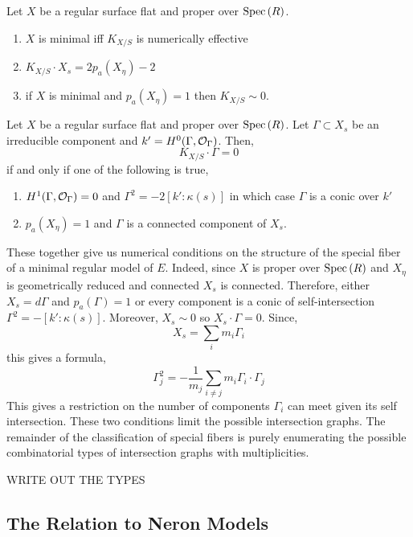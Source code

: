 \documentclass[12pt]{article}
\begin{document}
\begin{lemma}
Let $X$ be a regular surface flat and proper over $\mathrm{Spec}\left( R \right)$.
\begin{enumerate}
\item $X$ is minimal iff $K_{X/S}$ is numerically effective
\item $K_{X/S} \cdot X_s = 2 p_a(X_\eta) - 2$
\item if $X$ is minimal and $p_a(X_\eta) = 1$ then $K_{X/S} \sim 0$. 
\end{enumerate}
\end{lemma}

\begin{lemma}
Let $X$ be a regular surface flat and proper over $\mathrm{Spec}\left( R \right)$. Let $\Gamma \subset X_s$ be an irreducible component and $k' = H^0(\Gamma, \mathcal{O}_{\Gamma})$. Then,
\[ K_{X/S} \cdot \Gamma = 0 \]
if and only if one of the following is true,
\begin{enumerate}
\item $H^1(\Gamma, \mathcal{O}_{\Gamma}) = 0$ and $\Gamma^2 = -2 [k' : \kappa(s)]$ in which case $\Gamma$ is a conic over $k'$
\item $p_a(X_\eta) = 1$ and $\Gamma$ is a connected component of $X_s$. 
\end{enumerate}
\end{lemma}

These together give us numerical conditions on the structure of the special fiber of a minimal regular model of $E$. Indeed, since $X$ is proper over $\mathrm{Spec}\left( R \right)$ and $X_\eta$ is geometrically reduced and connected $X_s$ is connected. Therefore, either $X_s = d \Gamma$ and $p_a(\Gamma) = 1$ or every component is a conic of self-intersection $\Gamma^2 = - [k' : \kappa(s)]$. Moreover, $X_s \sim 0$ so $X_s \cdot \Gamma = 0$. Since,
\[ X_s = \sum_{i} m_i \Gamma_i \]
this gives a formula,
\[ \Gamma_j^2 = - \frac{1}{m_j} \sum_{i \neq j} m_i \Gamma_i \cdot \Gamma_j \]
This gives a restriction on the number of components $\Gamma_i$ can meet given its self intersection. These two conditions limit the possible intersection graphs. The remainder of the classification of special fibers is purely enumerating the possible combinatorial types of intersection graphs with multiplicities. 

\begin{theorem}[Kodaira]
WRITE OUT THE TYPES
\end{theorem}

\subsection{The Relation to Neron Models}
\end{document}
